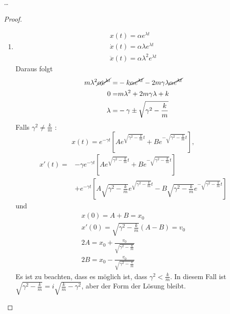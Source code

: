 \begin{Problem}
	\ldots	
\end{Problem}

\begin{proof}
	\begin{enumerate}
	\item 	
	\begin{gather*}
		x(t)=\alpha e^{\lambda t}\\
		\dot{x}(t)=\alpha\lambda e^{\lambda t}\\
		\ddot{x}(t)=\alpha\lambda^2e^{\lambda t}
	\end{gather*}
Daraus folgt
\begin{align*}
	m\lambda^2\cancel\alpha\cancel{e^{\lambda t}}=&-k\cancel{\alpha e^{\lambda t}}-2m\gamma\lambda\cancel{\alpha e^{\lambda t}}\\
	0=&m\lambda^2+2m\gamma\lambda+k\\
	\lambda=&-\gamma\pm \sqrt{\gamma^2-\frac{k}{m}}
\end{align*}
Falls $\gamma^2 \neq \frac{k}{m}$ :
\[
	x(t)=e^{-\gamma t}\left[ Ae^{\sqrt{\gamma^2-\frac{k}{m}} t}+Be^{-\sqrt{\gamma^2-\frac{k}{m}} t} \right] 
,\] 
\begin{align*}
	x'(t)=&-\gamma e^{-\gamma t}\left[ Ae^{\sqrt{\gamma^2-\frac{k}{m}} t}+Be^{-\sqrt{\gamma^2-\frac{k}{m}} t} \right] \\
	      &+e^{-\gamma t}\left[ A\sqrt{\gamma^2-\frac{k}{m}} e^{\sqrt{\gamma^2-\frac{k}{m}} t}-B\sqrt{\gamma^2-\frac{k}{m}} e^{-\sqrt{\gamma^2-\frac{k}{m}} t} \right] 
\end{align*}
und
\begin{gather*}
	x(0)=A+B=x_0\\
	x'(0)=\sqrt{\gamma^2-\frac{k}{m}} \left( A-B \right)=v_0\\
	2A=x_0+\frac{v_0}{\sqrt{\gamma^2-\frac{k}{m}} }\\
	2B=x_0-\frac{v_0}{\sqrt{\gamma^2-\frac{k}{m}} }
\end{gather*}
Es ist zu beachten, dass es möglich ist, dass $\gamma^2<\frac{k}{m}$. In diesem Fall ist $\sqrt{\gamma^2-\frac{k}{m}} =i\sqrt{\frac{k}{m}-\gamma^2} $, aber der Form der L\"{o}sung bleibt.


\end{enumerate}
\end{proof}
